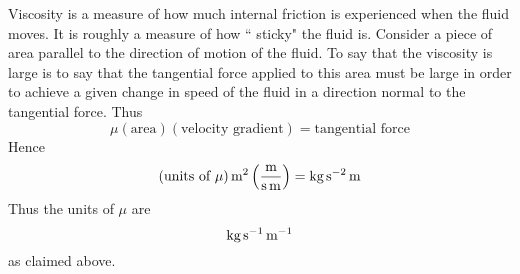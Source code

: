 Viscosity is a measure of how much internal friction is experienced
when the fluid moves. It is roughly a measure of how \textquotedblleft
sticky" the fluid is. Consider a piece of area parallel to the
direction of motion of the fluid. To say that the viscosity is large
is to say that the tangential force applied to this area must be large
in order to achieve a given change in speed of the fluid in a
direction normal to the tangential force. Thus
\begin{equation*}
  \mu (\text{area}) (\text{velocity gradient}) =\text{
    tangential force}
\end{equation*}
Hence
\begin{equation*}
  (\mbox{\rm units of $\mu$}) \mathop{\textrm{\rm m}}\nolimits^2\left(\frac{\mathop{\textrm{\rm m}}\nolimits}{\mathop{\textrm{\rm s}}\nolimits \mathop{\textrm{\rm m}}\nolimits}\right)
  = \mathop{\textrm{\rm kg}}\nolimits\mathop{\textrm{\rm s}}\nolimits^{-2}\mathop{\textrm{\rm m}}\nolimits
\end{equation*}
Thus the units of $\mu $ are
\begin{equation*}
  \mathop{\textrm{\rm kg}}\nolimits\mathop{\textrm{\rm s}}\nolimits^{-1}\mathop{\textrm{\rm m}}\nolimits^{-1}
\end{equation*}
as claimed above.

